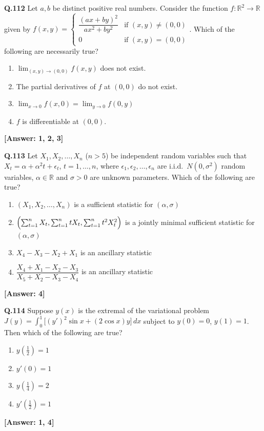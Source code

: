\documentclass[12pt,a4paper]{article}
\newcommand{\ans}[1]{\quad\textcolor{anscolor}{\textbf{[Answer: #1]}}}
\begin{document}
\textbf{Q.112} Let $a,b$ be distinct positive real numbers. Consider the function $f:\mathbb{R}^2\to\mathbb{R}$ given by $f(x,y)=\begin{cases}\dfrac{(ax+by)^2}{ax^2+by^2}&\text{if }(x,y)\neq(0,0)\\0&\text{if }(x,y)=(0,0)\end{cases}$. Which of the following are necessarily true?
\begin{enumerate}[label=\arabic*.]
\item $\lim_{(x,y)\to(0,0)}f(x,y)$ does not exist.
\item The partial derivatives of $f$ at $(0,0)$ do not exist.
\item $\lim_{x\to0}f(x,0)=\lim_{y\to0}f(0,y)$
\item $f$ is differentiable at $(0,0)$.
\end{enumerate}\ans{1, 2, 3}

\textbf{Q.113} Let $X_1,X_2,\ldots,X_n$ ($n>5$) be independent random variables such that $X_t=\alpha+\alpha^2t+\epsilon_t$, $t=1,\ldots,n$, where $\epsilon_1,\epsilon_2,\ldots,\epsilon_n$ are i.i.d.\ $N(0,\sigma^2)$ random variables, $\alpha\in\mathbb{R}$ and $\sigma>0$ are unknown parameters. Which of the following are true?
\begin{enumerate}[label=\arabic*.]
\item $(X_1,X_2,\ldots,X_n)$ is a sufficient statistic for $(\alpha,\sigma)$
\item $\Bigl(\sum_{t=1}^nX_t,\sum_{t=1}^ntX_t,\sum_{t=1}^nt^2X_t^2\Bigr)$ is a jointly minimal sufficient statistic for $(\alpha,\sigma)$
\item $X_4-X_3-X_2+X_1$ is an ancillary statistic
\item $\dfrac{X_4+X_1-X_2-X_3}{X_5+X_2-X_3-X_4}$ is an ancillary statistic
\end{enumerate}\ans{4}

\textbf{Q.114} Suppose $y(x)$ is the extremal of the variational problem $J(y)=\int_0^1\bigl[(y')^2\sin x+(2\cos x)y\bigr]\,dx$ subject to $y(0)=0$, $y(1)=1$. Then which of the following are true?
\begin{enumerate}[label=\arabic*.]
\item $y\!\left(\tfrac{1}{2}\right)=1$ \item $y'(0)=1$
\item $y\!\left(\tfrac{1}{4}\right)=2$ \item $y'\!\left(\tfrac{1}{2}\right)=1$
\end{enumerate}\ans{1, 4}
\end{document}
